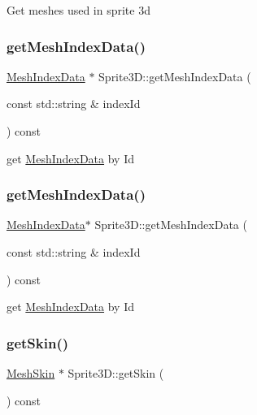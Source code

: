 Get meshes used in sprite 3d \mbox{\label{classSprite3D_a27d281cd27b2da08237b220b368bee2a}} 
\subsubsection{\texorpdfstring{get\+Mesh\+Index\+Data()}{getMeshIndexData()}\hspace{0.1cm}{\footnotesize\ttfamily [1/2]}}
{\footnotesize\ttfamily \hyperlink{classMeshIndexData}{Mesh\+Index\+Data} $\ast$ Sprite3\+D\+::get\+Mesh\+Index\+Data (\begin{DoxyParamCaption}\item[{const std\+::string \&}]{index\+Id }\end{DoxyParamCaption}) const}

get \hyperlink{classMeshIndexData}{Mesh\+Index\+Data} by Id \mbox{\label{classSprite3D_ab02c08862094a11914bd416751244f36}} 
\subsubsection{\texorpdfstring{get\+Mesh\+Index\+Data()}{getMeshIndexData()}\hspace{0.1cm}{\footnotesize\ttfamily [2/2]}}
{\footnotesize\ttfamily \hyperlink{classMeshIndexData}{Mesh\+Index\+Data}$\ast$ Sprite3\+D\+::get\+Mesh\+Index\+Data (\begin{DoxyParamCaption}\item[{const std\+::string \&}]{index\+Id }\end{DoxyParamCaption}) const}

get \hyperlink{classMeshIndexData}{Mesh\+Index\+Data} by Id \mbox{\label{classSprite3D_ae59d2299164cda3a6313eb4bd28b19e4}} 
\subsubsection{\texorpdfstring{get\+Skin()}{getSkin()}\hspace{0.1cm}{\footnotesize\ttfamily [1/2]}}
{\footnotesize\ttfamily \hyperlink{classMeshSkin}{Mesh\+Skin} $\ast$ Sprite3\+D\+::get\+Skin (\begin{DoxyParamCaption}{ }\end{DoxyParamCaption}) const}

